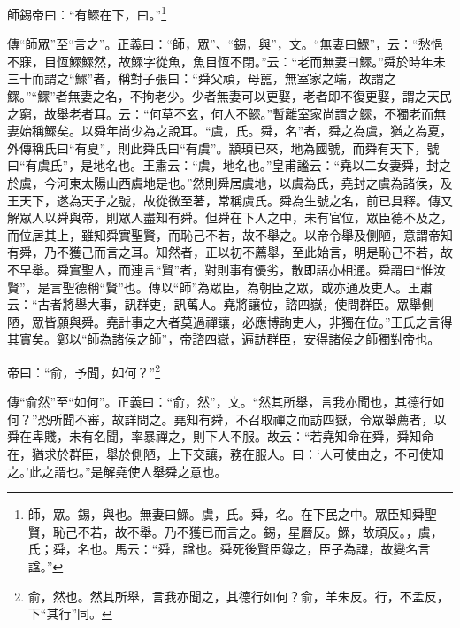 師錫帝曰：“有鰥在下，曰。”\footnote{師，眾。錫，與也。無妻曰鰥。虞，氏。舜，名。在下民之中。眾臣知舜聖賢，恥己不若，故不舉。乃不獲已而言之。錫，星曆反。鰥，故頑反。，虞，氏；舜，名也。馬云：“舜，諡也。舜死後賢臣錄之，臣子為諱，故變名言諡。”}

{\noindent\zhuan{}\fzbyks 傳“師眾”至“言之”。正義曰：“師，眾”、“錫，與”，文。“無妻曰鰥”，云：“愁悒不寐，目恆鰥鰥然，故鰥字從魚，魚目恆不閉。”云：“老而無妻曰鰥。”舜於時年未三十而謂之“鰥”者，稱對子張曰：“舜父頑，母嚚，無室家之端，故謂之鰥。”“鰥”者無妻之名，不拘老少。少者無妻可以更娶，老者即不復更娶，謂之天民之窮，故舉老者耳。云：“何草不玄，何人不鰥。”暫離室家尚謂之鰥，不獨老而無妻始稱鰥矣。以舜年尚少為之說耳。“虞，氏。舜，名”者，舜之為虞，猶之為夏，外傳稱氏曰“有夏”，則此舜氏曰“有虞”。顓頊已來，地為國號，而舜有天下，號曰“有虞氏”，是地名也。王肅云：“虞，地名也。”皇甫謐云：“堯以二女妻舜，封之於虞，今河東太陽山西虞地是也。”然則舜居虞地，以虞為氏，堯封之虞為諸侯，及王天下，遂為天子之號，故從微至著，常稱虞氏。舜為生號之名，前已具釋。傳又解眾人以舜與帝，則眾人盡知有舜。但舜在下人之中，未有官位，眾臣德不及之，而位居其上，雖知舜實聖賢，而恥己不若，故不舉之。以帝令舉及側陋，意謂帝知有舜，乃不獲己而言之耳。知然者，正以初不薦舉，至此始言，明是恥己不若，故不早舉。舜實聖人，而連言“賢”者，對則事有優劣，散即語亦相通。舜謂曰“惟汝賢”，是言聖德稱“賢”也。傳以“師”為眾臣，為朝臣之眾，或亦通及吏人。王肅云：“古者將舉大事，訊群吏，訊萬人。堯將讓位，諮四嶽，使問群臣。眾舉側陋，眾皆願與舜。堯計事之大者莫過禪讓，必應博詢吏人，非獨在位。”王氏之言得其實矣。鄭以“師為諸侯之師”，帝諮四嶽，遍訪群臣，安得諸侯之師獨對帝也。 \par}

帝曰：“俞，予聞，如何？”\footnote{俞，然也。然其所舉，言我亦聞之，其德行如何？俞，羊朱反。行，不孟反，下“其行”同。}

{\noindent\zhuan{}\fzbyks 傳“俞然”至“如何”。正義曰：“俞，然”，文。“然其所舉，言我亦聞也，其德行如何？”恐所聞不審，故詳問之。堯知有舜，不召取禪之而訪四嶽，令眾舉薦者，以舜在卑賤，未有名聞，率暴禪之，則下人不服。故云：“若堯知命在舜，舜知命在，猶求於群臣，舉於側陋，上下交讓，務在服人。曰：‘人可使由之，不可使知之。’此之謂也。”是解堯使人舉舜之意也。 \par}

